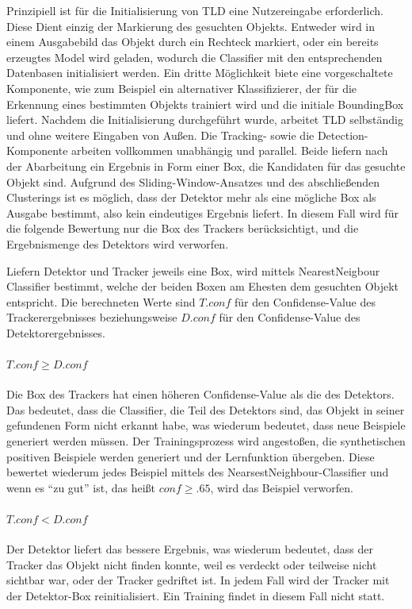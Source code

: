 	Prinzipiell ist für die Initialisierung von TLD eine Nutzereingabe erforderlich. Diese Dient einzig der Markierung des gesuchten Objekts. \label{subsection:working_components} Entweder wird in einem Ausgabebild das Objekt durch ein Rechteck markiert, oder ein bereits erzeugtes Model wird geladen, wodurch die Classifier mit den entsprechenden Datenbasen initialisiert werden. Ein dritte Möglichkeit biete eine vorgeschaltete Komponente, wie zum Beispiel ein alternativer Klassifizierer, der für die Erkennung eines bestimmten Objekts trainiert wird und die initiale BoundingBox liefert. Nachdem die Initialisierung durchgeführt wurde, arbeitet TLD selbständig und ohne weitere Eingaben von Außen. Die Tracking- sowie die Detection-Komponente arbeiten vollkommen unabhängig und parallel. Beide liefern nach der Abarbeitung ein Ergebnis in Form einer Box, die Kandidaten für das gesuchte Objekt sind. Aufgrund des Sliding-Window-Ansatzes und des abschließenden Clusterings ist es möglich, dass der Detektor mehr als eine mögliche Box als Ausgabe bestimmt, also kein eindeutiges Ergebnis liefert. In diesem Fall wird für die folgende Bewertung nur die Box des Trackers berücksichtigt, und die Ergebnismenge des Detektors wird verworfen.

	Liefern Detektor und Tracker jeweils eine Box, wird mittels NearestNeigbour Classifier bestimmt, welche der beiden Boxen am Ehesten dem gesuchten Objekt entspricht. Die berechneten Werte sind $T.conf$ für den Confidense-Value des Trackerergebnisses beziehungsweise $D.conf$ für den Confidense-Value des Detektorergebnisses.

	\paragraph{$T.conf\geq D.conf$}
	Die Box des Trackers hat einen höheren Confidense-Value als die des Detektors. Das bedeutet, dass die Classifier, die Teil des Detektors sind, das Objekt in seiner gefundenen Form nicht erkannt habe, was wiederum bedeutet, dass neue Beispiele generiert werden müssen. Der Trainingsprozess wird angestoßen, die synthetischen positiven Beispiele werden generiert und der Lernfunktion übergeben. Diese bewertet wiederum jedes Beispiel mittels des NearsestNeighbour-Classifier und wenn es ``zu gut'' ist, das heißt $conf\geq.65$, wird das Beispiel verworfen.

	\paragraph{$T.conf<D.conf$ }
	Der Detektor liefert das bessere Ergebnis, was wiederum bedeutet,	dass der Tracker das Objekt nicht finden konnte, weil es verdeckt oder teilweise nicht sichtbar war, oder der Tracker gedriftet ist. In jedem Fall wird der Tracker mit der Detektor-Box reinitialisiert. Ein Training findet in diesem Fall nicht statt.

